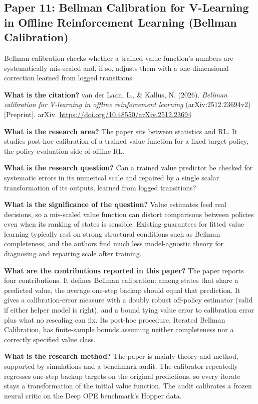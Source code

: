 \documentclass[11pt]{article}
\newcommand{\paper}[1]{\subsection*{#1}}
\newcommand{\q}[2]{\item \textbf{#1} #2}
\begin{document}
\paper{Paper 11: Bellman Calibration for V-Learning in Offline Reinforcement Learning (Bellman Calibration)}
Bellman calibration checks whether a trained value function's numbers are systematically mis-scaled and, if so, adjusts them with a one-dimensional correction learned from logged transitions.
\begin{qna}

\q{What is the citation?}
van der Laan, L., \& Kallus, N. (2026). \emph{Bellman calibration for V-learning in offline reinforcement learning} (arXiv:2512.23694v2) [Preprint]. arXiv. \url{https://doi.org/10.48550/arXiv.2512.23694}

\q{What is the research area?}
The paper sits between statistics and RL. It studies post-hoc calibration of a trained value function for a fixed target policy, the policy-evaluation side of offline RL.

\q{What is the research question?}
Can a trained value predictor be checked for systematic errors in its numerical scale and repaired by a single scalar transformation of its outputs, learned from logged transitions?

\q{What is the significance of the question?}
Value estimates feed real decisions, so a mis-scaled value function can distort comparisons between policies even when its ranking of states is sensible. Existing guarantees for fitted value learning typically rest on strong structural conditions such as Bellman completeness, and the authors find much less model-agnostic theory for diagnosing and repairing scale after training.

\q{What are the contributions reported in this paper?}
The paper reports four contributions. It defines Bellman calibration: among states that share a predicted value, the average one-step backup should equal that prediction. It gives a calibration-error measure with a doubly robust off-policy estimator (valid if either helper model is right), and a bound tying value error to calibration error plus what no rescaling can fix. Its post-hoc procedure, Iterated Bellman Calibration, has finite-sample bounds assuming neither completeness nor a correctly specified value class.

\q{What is the research method?}
The paper is mainly theory and method, supported by simulations and a benchmark audit. The calibrator repeatedly regresses one-step backup targets on the original predictions, so every iterate stays a transformation of the initial value function. The audit calibrates a frozen neural critic on the Deep OPE benchmark's Hopper data.


\end{qna}
\end{document}
